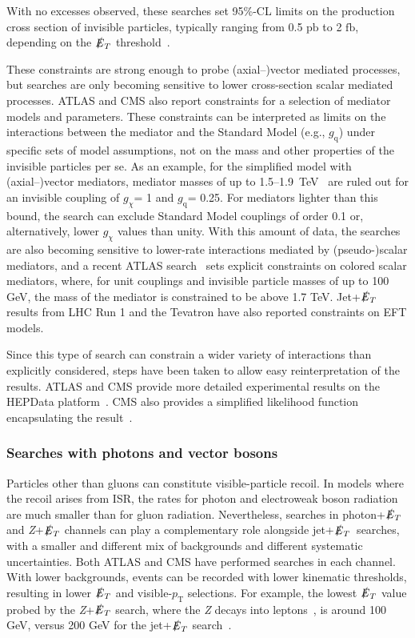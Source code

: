 \documentclass{ar-1col}
\newcommand{\chiDM}{\ensuremath{\chi}\xspace}
\newcommand{\IP}{invisible particle}
\newcommand{\gDM}{\ensuremath{g_{\chiDM}}\xspace}
\newcommand{\gdm}{\gDM}
\newcommand{\gq}{$g_{\mathrm{q}}$\xspace}
\newcommand{\pt}{\ensuremath{p_\mathrm{T}}\xspace}
\newcommand{\MET}{\ensuremath{\slashed{E}_T}\xspace}
\newcommand{\fb}{\ensuremath{\mathrm{fb}}\xspace}
\newcommand{\pb}{\ensuremath{\mathrm{pb}}\xspace}
\begin{document}
With no excesses observed, these searches set 95\%-CL limits
on the production cross section of {\IP}s, typically ranging from
0.5 \pb to 2 \fb, depending on the \MET threshold~\cite{Aaboud:2017phn}. 

These constraints are strong enough to probe (axial--)vector mediated
processes, but searches are only becoming sensitive to lower cross-section scalar mediated processes. 
ATLAS and CMS also report
constraints for a selection of mediator models and parameters. These constraints
can be interpreted as limits on the interactions between the
mediator and the Standard Model (e.g., \gq) under specific sets of model
assumptions, not on the mass and other properties of the {\IP}s
per se. As an example, for the simplified model with
(axial--)vector mediators, mediator masses of up to
1.5--1.9~TeV~\cite{Aaboud:2017phn,Sirunyan:2017jix} are ruled out
for an invisible coupling of \gdm = 1 and \gq = 0.25. For mediators lighter than
this bound, the search can exclude Standard Model couplings of order 0.1 or,
alternatively, lower \gdm values than unity. With this amount of
data, the searches are also becoming sensitive to lower-rate
interactions mediated by (pseudo-)scalar mediators, and a recent
ATLAS search~\cite{Aaboud:2017phn} sets explicit constraints on
colored scalar mediators, where, for unit couplings and invisible
particle masses of up to 100 GeV, the mass of the mediator is
constrained to be above 1.7 TeV. Jet+\MET results from LHC Run 1
and the Tevatron have also reported constraints on EFT models.

Since this type of search can constrain a wider variety of
interactions than explicitly considered, steps have been taken to
allow easy reinterpretation of the results. ATLAS and CMS provide
more detailed experimental results on the HEPData
platform~\cite{Maguire:2017ypu}. CMS also provides a simplified
likelihood function encapsulating the
result~\cite{Collaboration:2242860,Sirunyan:2017jix}.

\subsubsection{Searches with photons and vector bosons}\label{subsub:monoV}

Particles other than gluons can constitute visible-particle
recoil. In models where the recoil arises from ISR, the rates
for photon and electroweak boson radiation are much smaller than
for gluon radiation. Nevertheless, searches in photon+\MET and
\textit{Z}+\MET channels can play a complementary role alongside jet+\MET\ searches,
with a smaller and different mix of backgrounds and different
systematic uncertainties. Both ATLAS and CMS have performed
searches in each channel. With lower backgrounds, events can be
recorded with lower kinematic thresholds, resulting in lower \MET
and visible-\pt{} selections. For example, the lowest \MET value
probed by the \textit{Z}+\MET search, where the \textit{Z} decays into
leptons~\cite{Sirunyan:2017qfc,Aaboud:2017bja}, is around 100 GeV,
versus 200 GeV for the jet+\MET search~\cite{Sirunyan:2017jix}.
\end{document}
